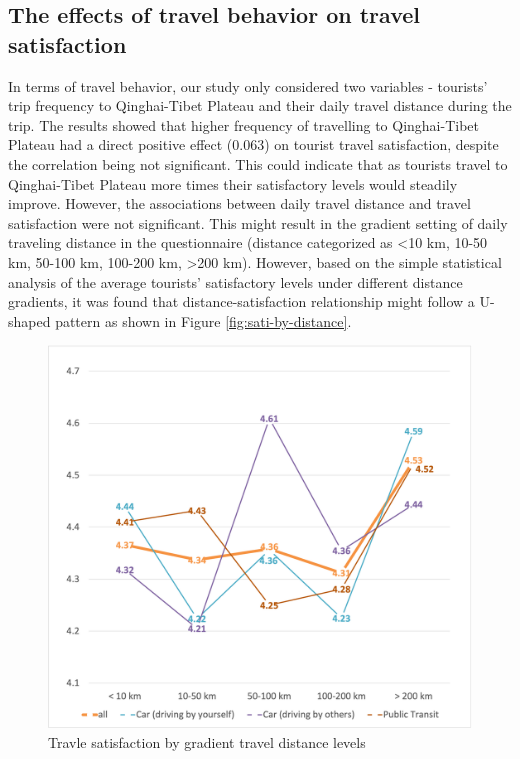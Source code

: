 \documentclass[
11pt, %
oneside, %
english, %
singlespacing, %
]{macthesis} %
\begin{document}
\subsection{The effects of travel behavior on travel satisfaction}\label{the-effects-of-travel-behavior-on-travel-satisfaction}

In terms of travel behavior, our study only considered two variables - tourists' trip frequency to Qinghai-Tibet Plateau and their daily travel distance during the trip. The results showed that higher frequency of travelling to Qinghai-Tibet Plateau had a direct positive effect (0.063) on tourist travel satisfaction, despite the correlation being not significant. This could indicate that as tourists travel to Qinghai-Tibet Plateau more times their satisfactory levels would steadily improve. However, the associations between daily travel distance and travel satisfaction were not significant. This might result in the gradient setting of daily traveling distance in the questionnaire (distance categorized as \textless10 km, 10-50 km, 50-100 km, 100-200 km, \textgreater200 km). However, based on the simple statistical analysis of the average tourists' satisfactory levels under different distance gradients, it was found that distance-satisfaction relationship might follow a U-shaped pattern as shown in Figure \ref{fig:sati-by-distance}.

\begin{figure}

{\centering \includegraphics[width=0.8\linewidth]{figure/sati-by-distance} 

}

\caption{\label{fig:sati-by-distance} Travle satisfaction by gradient travel distance levels}\label{fig:fig3-sati-by-distance}
\end{figure}
\end{document}

